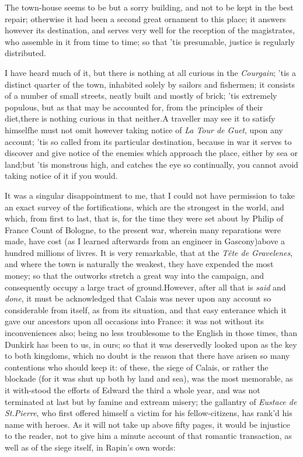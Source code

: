 \documentclass{article}
\begin{document}
The town-house seems to be but a sorry building, and not to be
kept in the best repair; otherwise it had been a second great
ornament to this place; it answers however its destination, and
serves very well for the reception of the magistrates, who assemble
in it from time to time; so that ’tis presumable, justice is
regularly distributed.

I have heard much of it, but there is nothing at all curious in
the \textit{Courgain}; ’tis a distinct quarter of the town,
inhabited solely by sailors and fishermen; it consists of a number
of small streets, neatly built and mostly of brick; ’tis
extremely populous, but as that may be accounted for, from the
principles of their diet,\tsk there is nothing curious in that
neither.\tsh A traveller may see it to satisfy
himself\tsk he must not omit however taking notice of \textit{La Tour de Guet}, upon
any account; ’tis so called from its particular destination,
because in war it serves to discover and give notice of the enemies
which approach the place, either by sea or land;\tsh but
’tis monstrous high, and catches the eye so continually, you
cannot avoid taking notice of it if you would.

It was a singular disappointment to me, that I could not have
permission to take an exact survey of the fortifications, which are
the strongest in the world, and which, from first to last, that is,
for the time they were set about by Philip of France
Count of Bologne, to the present war, wherein many
reparations were made, have cost (as I learned afterwards from an
engineer in Gascony)\tsk above a hundred millions of
livres. It is very remarkable, that at the \textit{Tête de
Gravelenes}, and where the town is naturally the weakest, they
have expended the most money; so that the outworks stretch a great
way into the campaign, and consequently occupy a large tract of
ground.\break\tsk However, after all that is \textit{said} and
\textit{done}, it must be acknowledged that Calais was never
upon any account so considerable from itself, as from its
situation, and that easy enterance which it gave our ancestors upon
all occasions into France: it was not without its
inconveniences also; being no less troublesome to the
English in those times, than Dunkirk has been to us,
in ours; so that it was deservedly looked upon as the key to both
kingdoms, which no doubt is the reason that there have arisen so
many contentions who should keep it: of these, the siege of
Calais, or rather the blockade (for it was shut up both by
land and sea), was the most memorable, as it with-stood the efforts
of Edward the third a whole year, and was not terminated at
last but by famine and extream misery; the gallantry of \textit{Eustace
de St.\@ Pierre}, who first offered himself a victim for his
fellow-citizens, has rank’d his name with heroes. As it will
not take up above fifty pages, it would be injustice to the reader,
not to give him a minute account of that romantic transaction, as well
as of the siege itself, in Rapin’s own words:
\end{document}
